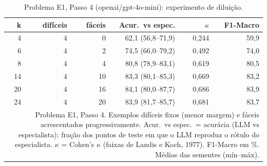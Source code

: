 \begin{table}[htbp]
\centering
\small
\caption{Problema E1, Passo 4 (openai/gpt-4o-mini): experimento de diluição.}
\label{tab:bloco2_E1_passo4_diluicao_gpt4mini}
\begin{tabular}{rrrrrr}
\toprule
k & difíceis & fáceis & Acur.\ vs espec. & $\kappa$ & F1-Macro \\
\midrule
4 & 4 & 0 & 62,1 (56,8–71,9) & 0,244 & 59,9 \\
6 & 4 & 2 & 74,5 (66,0–79,2) & 0,492 & 74,0 \\
8 & 4 & 4 & 80,8 (78,9–83,1) & 0,619 & 80,5 \\
14 & 4 & 10 & 83,3 (80,1–85,3) & 0,669 & 83,2 \\
20 & 4 & 16 & 84,1 (80,0–87,7) & 0,686 & 83,9 \\
24 & 4 & 20 & 83,9 (81,7–85,7) & 0,681 & 83,7 \\
\bottomrule
\multicolumn{6}{p{0.95\linewidth}}{\footnotesize Problema E1, Passo 4. Exemplos difíceis fixos (menor margem) e fáceis acrescentados progressivamente. Acur.\ vs espec.\ = acurácia (LLM vs especialista): fração dos pontos de teste em que o LLM reproduz o rótulo do especialista. $\kappa$ = Cohen's $\kappa$ (faixas de Landis e Koch, 1977). F1-Macro em \%. Médias das sementes (mín–máx).} \\
\end{tabular}
\end{table}
